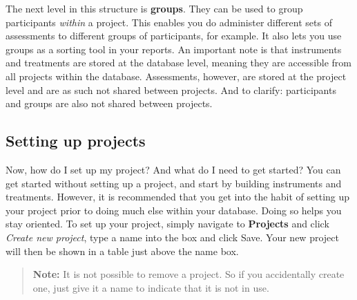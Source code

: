 \documentclass[
]{book}
\begin{document}
The next level in this structure is \textbf{groups}. They can be used to group participants \emph{within} a project. This enables you do administer different sets of assessments to different groups of participants, for example. It also lets you use groups as a sorting tool in your reports.
An important note is that instruments and treatments are stored at the database level, meaning they are accessible from all projects within the database. Assessments, however, are stored at the project level and are as such not shared between projects.
And to clarify: participants and groups are also not shared between projects.

\subsection{Setting up projects}\label{setting-up-projects}

Now, how do I set up my project? And what do I need to get started?
You can get started without setting up a project, and start by building instruments and treatments. However, it is recommended that you get into the habit of setting up your project prior to doing much else within your database. Doing so helps you stay oriented.
To set up your project, simply navigate to \textbf{Projects} and click \emph{Create new project}, type a name into the box and click Save. Your new project will then be shown in a table just above the name box.

\begin{quote}
\textbf{Note:} It is not possible to remove a project. So if you accidentally create one, just give it a name to indicate that it is not in use.
\end{quote}
\end{document}

